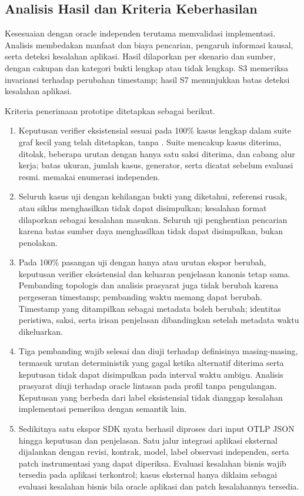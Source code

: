 \subsection{Analisis Hasil dan Kriteria Keberhasilan}
Kesesuaian dengan oracle independen terutama memvalidasi implementasi. Analisis membedakan manfaat dan biaya pencarian, pengaruh informasi kausal, serta deteksi kesalahan aplikasi. Hasil dilaporkan per skenario dan sumber, dengan cakupan dan kategori bukti lengkap atau tidak lengkap. S3 memeriksa invariansi terhadap perubahan timestamp; hasil S7 menunjukkan batas deteksi kesalahan aplikasi.

Kriteria penerimaan prototipe ditetapkan sebagai berikut.
\begin{enumerate}
  \item Keputusan verifier eksistensial sesuai  pada 100\% kasus lengkap dalam suite graf kecil yang telah ditetapkan, tanpa . Suite mencakup kasus diterima, ditolak, beberapa urutan dengan hanya satu saksi diterima, dan cabang alur kerja; batas ukuran, jumlah kasus, generator, serta  dicatat sebelum evaluasi resmi.  memakai enumerasi independen.
  \item Seluruh kasus uji dengan kehilangan bukti yang diketahui, referensi rusak, atau siklus menghasilkan tidak dapat disimpulkan; kesalahan format dilaporkan sebagai kesalahan masukan. Seluruh uji penghentian pencarian karena batas sumber daya menghasilkan tidak dapat disimpulkan, bukan penolakan.
  \item Pada 100\% pasangan uji dengan hanya  atau urutan ekspor berubah, keputusan verifier eksistensial dan keluaran penjelasan kanonis tetap sama. Pembanding topologis dan analisis prasyarat juga tidak berubah karena pergeseran timestamp; pembanding waktu memang dapat berubah. Timestamp yang ditampilkan sebagai metadata boleh berubah; identitas peristiwa, saksi, serta irisan penjelasan dibandingkan setelah metadata waktu dikeluarkan.
  \item Tiga pembanding wajib selesai dan diuji terhadap definisinya masing-masing, termasuk urutan deterministik yang gagal ketika alternatif diterima serta keputusan tidak dapat disimpulkan pada interval waktu ambigu. Analisis prasyarat diuji terhadap oracle lintasan pada profil tanpa pengulangan. Keputusan yang berbeda dari label eksistensial tidak dianggap kesalahan implementasi pemeriksa dengan semantik lain.
  \item Sedikitnya satu ekspor SDK nyata berhasil diproses dari input OTLP JSON hingga keputusan dan penjelasan. Satu jalur integrasi aplikasi eksternal dijalankan dengan revisi, kontrak, model, label observasi independen, serta patch instrumentasi yang dapat diperiksa. Evaluasi kesalahan bisnis wajib tersedia pada aplikasi terkontrol; kasus eksternal hanya diklaim sebagai evaluasi kesalahan bisnis bila oracle aplikasi dan patch kesalahannya tersedia.
\end{enumerate}

